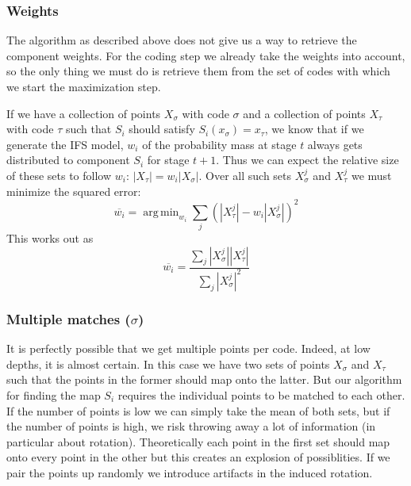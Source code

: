 \documentclass[10pt,a4paper,oneside]{article}
\theoremstyle{definition}
\DeclareMathOperator*{\argmin}{arg\,min}
\begin{document}


\subsubsection*{Weights}

The algorithm as described above does not give us a way to retrieve the component weights. For the coding step we already take the weights into account, so the only thing we must do is retrieve them from the set of codes with which we start the maximization step.

If we have a collection of points $X_\sigma$ with code $\sigma$ and a collection of points $X_\tau$ with code $\tau$ such that $S_i$ should satisfy $S_i(x_\sigma) = x_\tau$, we know that if we generate the IFS model, $w_i$ of the probability mass at stage $t$ always gets distributed to component $S_i$ for stage $t + 1$. Thus we can expect the relative size of these sets to follow $w_i$: $|X_\tau| = w_i |X_\sigma|$. Over all such sets $X_\sigma^j$ and $X_\tau^j$ we must minimize the squared error:
\[
\overline{w_i} = \argmin_{w_i} \sum_{j} \left( |X_\tau^j| - w_i |X_\sigma^j| \right)^2
\]
This works out as 
\[
\overline{w_i} = \frac{\sum_{j}|X_\sigma^j||X_\tau^j|}{\sum_{j}|X_\sigma^j|^2}
\]

\subsubsection*{Multiple matches ($\sigma$)}

It is perfectly possible that we get multiple points per code. Indeed, at low depths, it is almost certain. In this case we have two sets of points $X_\sigma$ and $X_\tau$ such that the points in the former should map onto the latter. But our algorithm for finding the map $S_i$ requires the individual points to be matched to each other. If the number of points is low we can simply take the mean of both sets, but if the number of points is high, we risk throwing away a lot of information (in particular about rotation). Theoretically each point in the first set should map onto every point in the other but this creates an explosion of possiblities. If we pair the points up randomly we introduce artifacts in the induced rotation.
\end{document}

